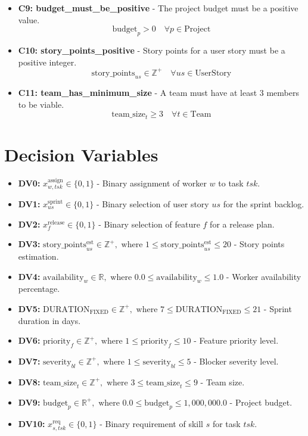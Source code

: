 \documentclass[11pt]{article}
\begin{document}
\begin{itemize}
    \item \textbf{C9: budget\_must\_be\_positive} - The project budget must be a positive value.
        \[ \text{budget}_{p} > 0 \quad \forall p \in \text{Project} \]
    \item \textbf{C10: story\_points\_positive} - Story points for a user story must be a positive integer.
        \[ \text{story\_points}_{us} \in \mathbb{Z}^{+} \quad \forall us \in \text{UserStory} \]
    \item \textbf{C11: team\_has\_minimum\_size} - A team must have at least 3 members to be viable.
        \[ \text{team\_size}_{t} \geq 3 \quad \forall t \in \text{Team} \]
\end{itemize}

\section{Decision Variables}
\begin{itemize}
    \item \textbf{DV0:} $x^{\text{assign}}_{w, tsk} \in \{0, 1\}$ - Binary assignment of worker $w$ to task $tsk$.
    \item \textbf{DV1:} $x^{\text{sprint}}_{us} \in \{0, 1\}$ - Binary selection of user story $us$ for the sprint backlog.
    \item \textbf{DV2:} $x^{\text{release}}_{f} \in \{0, 1\}$ - Binary selection of feature $f$ for a release plan.
    \item \textbf{DV3:} $\text{story\_points}^{\text{est}}_{us} \in \mathbb{Z}^{+}, \text{ where } 1 \leq \text{story\_points}^{\text{est}}_{us} \leq 20$ - Story points estimation.
    \item \textbf{DV4:} $\text{availability}_{w} \in \mathbb{R}, \text{ where } 0.0 \leq \text{availability}_{w} \leq 1.0$ - Worker availability percentage.
    \item \textbf{DV5:} $\text{DURATION}_{\text{FIXED}} \in \mathbb{Z}^{+}, \text{ where } 7 \leq \text{DURATION}_{\text{FIXED}} \leq 21$ - Sprint duration in days.
    \item \textbf{DV6:} $\text{priority}_{f} \in \mathbb{Z}^{+}, \text{ where } 1 \leq \text{priority}_{f} \leq 10$ - Feature priority level.
    \item \textbf{DV7:} $\text{severity}_{bl} \in \mathbb{Z}^{+}, \text{ where } 1 \leq \text{severity}_{bl} \leq 5$ - Blocker severity level.
    \item \textbf{DV8:} $\text{team\_size}_{t} \in \mathbb{Z}^{+}, \text{ where } 3 \leq \text{team\_size}_{t} \leq 9$ - Team size.
    \item \textbf{DV9:} $\text{budget}_{p} \in \mathbb{R}^{+}, \text{ where } 0.0 \leq \text{budget}_{p} \leq 1,000,000.0$ - Project budget.
    \item \textbf{DV10:} $x^{\text{req}}_{s, tsk} \in \{0, 1\}$ - Binary requirement of skill $s$ for task $tsk$.
\end{itemize}
\end{document}
